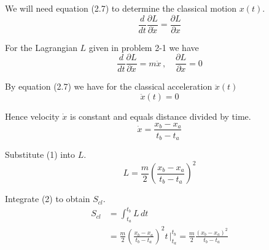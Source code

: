 


We will need equation (2.7) to determine the classical motion $x(t)$.
\begin{equation*}
\frac{d}{dt}\frac{\partial L}{\partial\dot x}=\frac{\partial L}{\partial x}
\tag{2.7}
\end{equation*}

For the Lagrangian $L$ given in problem 2-1 we have
\begin{equation*}
\frac{d}{dt}\frac{\partial L}{\partial\dot x}=m\ddot x\,, %
\quad
\frac{\partial L}{\partial x}=0
\end{equation*}

By equation (2.7) we have for the classical acceleration $\ddot x(t)$
\begin{equation*}
\ddot x(t)=0
\end{equation*}

Hence velocity $\dot x$ is constant and equals distance divided by time.
\begin{equation*}
\dot x=\frac{x_b-x_a}{t_b-t_a}
\tag{1}
\end{equation*}

Substitute (1) into $L$.
\begin{equation*}
L=\frac{m}{2}\left(\frac{x_b-x_a}{t_b-t_a}\right)^2
\tag{2}
\end{equation*}

Integrate (2) to obtain $S_{cl}$.
\begin{align*}
S_{cl}
&=\int_{t_a}^{t_b}L\,dt
\\
&=\frac{m}{2}\left(\frac{x_b-x_a}{t_b-t_a}\right)^2 t\,\bigg|_{t_a}^{t_b}
=\frac{m}{2}\frac{(x_b-x_a)^2}{t_b-t_a}
\end{align*}



